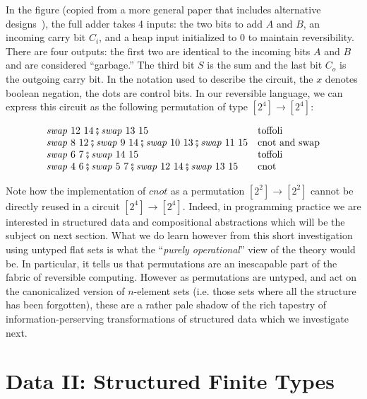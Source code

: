 \documentclass{article}
\begin{document}
In the figure (copied from a more general paper that includes
alternative designs~\cite{Rentergem2005OptimalDO}), the full adder
takes 4 inputs: the two bits to add $A$ and $B$, an incoming carry bit
$C_i$, and a heap input initialized to 0 to maintain
reversibility. There are four outputs: the first two are identical to
the incoming bits $A$ and $B$ and are considered ``garbage.'' The
third bit $S$ is the sum and the last bit $C_o$ is the outgoing carry
bit. In the notation used to describe the circuit, the $x$ denotes
boolean negation, the dots are control bits. In our reversible
language, we can express this circuit as the following permutation of
type $[2^4] \rightarrow [2^4]$:

\[\begin{array}{ll}
\mathit{swap}~12~14 \fatsemi \mathit{swap}~13~15 & \mbox{toffoli} \\
\mathit{swap}~8~12 \fatsemi \mathit{swap}~9~14 \fatsemi 
    \mathit{swap}~10~13 \fatsemi \mathit{swap}~11~15 & \mbox{cnot and swap} \\
\mathit{swap}~6~7 \fatsemi \mathit{swap}~14~15 & \mbox{toffoli} \\
\mathit{swap}~4~6 \fatsemi \mathit{swap}~5~7 \fatsemi
    \mathit{swap}~12~14 \fatsemi \mathit{swap}~13~15 & \mbox{cnot}
\end{array}\]

Note how the implementation of $\mathit{cnot}$ as a permutation
$[2^2] \rightarrow [2^2]$ cannot be directly reused in a circuit
$[2^4] \rightarrow [2^4]$. Indeed, in programming practice we are
interested in structured data and compositional abstractions which
will be the subject on next section. What we do learn however from
this short investigation using untyped flat sets is what the
``\emph{purely operational}'' view of the theory would be. In
particular, it tells us that permutations are an inescapable part of
the fabric of reversible computing.  However as permutations are
untyped, and act on the canonicalized version of $n$-element sets
(i.e. those sets where all the structure has been forgotten), these
are a rather pale shadow of the rich tapestry of
information-perserving transformations of structured data which we
investigate next.

\section{Data II: Structured Finite Types}
\end{document}
